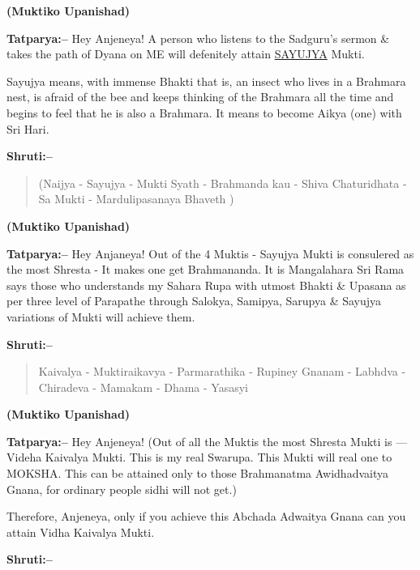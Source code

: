 \begin{flushright}
\textbf{(Muktiko Upanishad)}
\end{flushright}

\textbf{Tatparya:–} Hey Anjeneya! A person who listens to the Sadguru's sermon \& takes the path of Dyana on ME will defenitely attain \underline{SAYUJYA} Mukti.

Sayujya means, with immense Bhakti that is, an insect who lives in a Brahmara nest, is afraid of the bee and keeps thinking of the Brahmara all the time and begins to feel that he is also a Brahmara. It means to become Aikya (one) with Sri Hari.

\textbf{Shruti:–}

\begin{verse}
(Naijya - Sayujya - Mukti Syath - Brahmanda kau - Shiva Chaturidhata - Sa Mukti - Mardulipasanaya Bhaveth )
\end{verse}

\begin{flushright}
\textbf{(Muktiko Upanishad)}
\end{flushright}

\textbf{Tatparya:–} Hey Anjaneya! Out of the 4 Muktis - Sayujya Mukti is consulered as the most Shresta - It makes one get Brahmananda. It is Mangalahara Sri Rama says those who understands my Sahara Rupa with utmost Bhakti \& Upasana as per three level of Parapathe through Salokya, Samipya, Sarupya \& Sayujya variations of Mukti will achieve them.

\textbf{Shruti:–}

\begin{verse}
Kaivalya - Muktiraikavya - Parmarathika - Rupiney  Gnanam - Labhdva - Chiradeva - Mamakam - Dhama - Yasasyi 
\end{verse}

\begin{flushright}
\textbf{(Muktiko Upanishad)}
\end{flushright}

\textbf{Tatparya:–} Hey Anjeneya! (Out of all the Muktis the most Shresta Mukti is — Videha Kaivalya Mukti. This is my real Swarupa. This Mukti will real one to MOKSHA. This can be attained only to those Brahmanatma Awidhadvaitya Gnana, for ordinary people sidhi will not get.)

Therefore, Anjeneya, only if you achieve this Abchada Adwaitya Gnana can you attain Vidha Kaivalya Mukti.

\textbf{Shruti:–}

